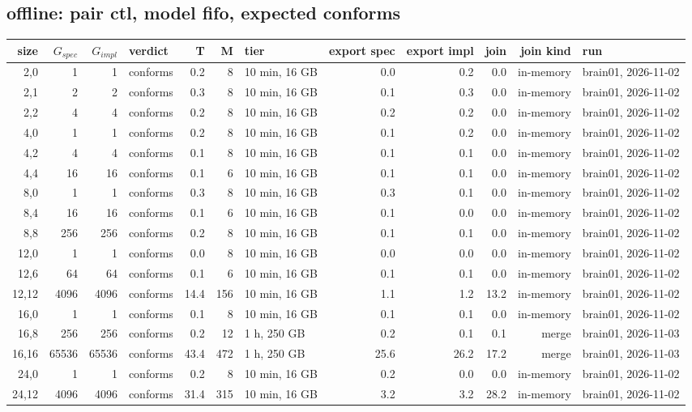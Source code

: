 \documentclass[10pt]{article}
\begin{document}
\subsection*{offline: pair \textsf{ctl}, model fifo, expected conforms}
\begin{longtable}{@{}rrrlrrlrrrrl@{}}
\toprule
size & $G_{\mathit{spec}}$ & $G_{\mathit{impl}}$ & verdict & T & M & tier & export spec & export impl & join & join kind & run \\
\midrule
\endhead
\color{red} 2,0 & 1 & 1 & conforms & 0.2 & 8 & 10 min, 16 GB & 0.0 & 0.2 & 0.0 & in-memory & brain01, 2026-11-02 \\
\color{red} 2,1 & 2 & 2 & conforms & 0.3 & 8 & 10 min, 16 GB & 0.1 & 0.3 & 0.0 & in-memory & brain01, 2026-11-02 \\
\color{red} 2,2 & 4 & 4 & conforms & 0.2 & 8 & 10 min, 16 GB & 0.2 & 0.2 & 0.0 & in-memory & brain01, 2026-11-02 \\
\color{red} 4,0 & 1 & 1 & conforms & 0.2 & 8 & 10 min, 16 GB & 0.1 & 0.2 & 0.0 & in-memory & brain01, 2026-11-02 \\
\color{red} 4,2 & 4 & 4 & conforms & 0.1 & 8 & 10 min, 16 GB & 0.1 & 0.1 & 0.0 & in-memory & brain01, 2026-11-02 \\
\color{red} 4,4 & 16 & 16 & conforms & 0.1 & 6 & 10 min, 16 GB & 0.1 & 0.1 & 0.0 & in-memory & brain01, 2026-11-02 \\
\color{red} 8,0 & 1 & 1 & conforms & 0.3 & 8 & 10 min, 16 GB & 0.3 & 0.1 & 0.0 & in-memory & brain01, 2026-11-02 \\
\color{red} 8,4 & 16 & 16 & conforms & 0.1 & 6 & 10 min, 16 GB & 0.1 & 0.0 & 0.0 & in-memory & brain01, 2026-11-02 \\
\color{red} 8,8 & 256 & 256 & conforms & 0.2 & 8 & 10 min, 16 GB & 0.1 & 0.1 & 0.0 & in-memory & brain01, 2026-11-02 \\
\color{red} 12,0 & 1 & 1 & conforms & 0.0 & 8 & 10 min, 16 GB & 0.0 & 0.0 & 0.0 & in-memory & brain01, 2026-11-02 \\
\color{red} 12,6 & 64 & 64 & conforms & 0.1 & 6 & 10 min, 16 GB & 0.1 & 0.1 & 0.0 & in-memory & brain01, 2026-11-02 \\
\color{red} 12,12 & 4096 & 4096 & conforms & 14.4 & 156 & 10 min, 16 GB & 1.1 & 1.2 & 13.2 & in-memory & brain01, 2026-11-02 \\
\color{red} 16,0 & 1 & 1 & conforms & 0.1 & 8 & 10 min, 16 GB & 0.1 & 0.1 & 0.0 & in-memory & brain01, 2026-11-02 \\
\color{blue} 16,8 & 256 & 256 & conforms & 0.2 & 12 & 1 h, 250 GB & 0.2 & 0.1 & 0.1 & merge & brain01, 2026-11-03 \\
\color{blue} 16,16 & 65536 & 65536 & conforms & 43.4 & 472 & 1 h, 250 GB & 25.6 & 26.2 & 17.2 & merge & brain01, 2026-11-03 \\
\color{red} 24,0 & 1 & 1 & conforms & 0.2 & 8 & 10 min, 16 GB & 0.2 & 0.0 & 0.0 & in-memory & brain01, 2026-11-02 \\
\color{red} 24,12 & 4096 & 4096 & conforms & 31.4 & 315 & 10 min, 16 GB & 3.2 & 3.2 & 28.2 & in-memory & brain01, 2026-11-02 \\
\bottomrule
\end{longtable}
\end{document}
